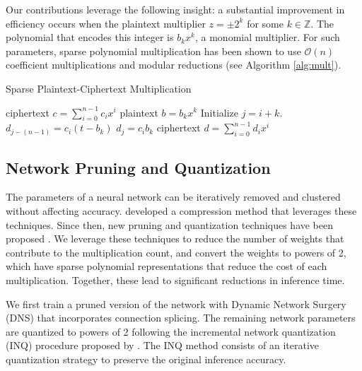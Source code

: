 \documentclass[conference]{IEEEtran}
\begin{document}
Our contributions leverage the following insight: a substantial improvement in efficiency occurs when the plaintext multiplier  $z = \pm 2^k$ for some $k \in \mathbb{Z}$.
The polynomial that encodes this integer is $b_k x^k$, a monomial multiplier.
For such parameters, sparse polynomial multiplication \cite{akleylek2016efficient} has been shown to use $\mathcal{O}(n)$ coefficient multiplications and modular reductions (see Algorithm \ref{alg:mult}).

\begin{algorithm}[!htbp]%
   \caption{Sparse Plaintext-Ciphertext Multiplication}
   \label{alg:mult}
\begin{algorithmic}
    ciphertext $c = \sum_{i=0}^{n - 1} c_ix^i$
   plaintext $b=b_k x^k$
   \STATE Initialize $j = i + k$.
   \STATE $d_{j-(n-1)} = c_i (t - b_k)$
   \ELSE
   \STATE $d_j = c_i b_k$
   \ENDIF
   \ENDFOR
    ciphertext $d = \sum_{i=0}^{n - 1} d_ix^i$
\end{algorithmic}
\end{algorithm}


\subsection{Network Pruning and Quantization}\label{sec:pruning}

The parameters of a neural network can be iteratively removed and clustered without affecting accuracy.
\cite{han2015deep} developed a compression method that leverages these techniques.
Since then, new pruning and quantization techniques have been proposed \cite{luo2017thinet}. %
We leverage these techniques to reduce the number of weights that contribute to the multiplication count, and convert the weights to powers of 2, which have sparse polynomial representations that reduce the cost of each multiplication. Together, these lead to significant reductions in inference time.

We first train a pruned version of the network with Dynamic Network Surgery (DNS) \cite{guo2016dynamic} that incorporates connection splicing.
The remaining network parameters are quantized to powers of 2 following the incremental network quantization (INQ) procedure proposed by \cite{zhou2017incremental}.
The INQ method consists of an iterative quantization strategy to preserve the original inference accuracy.
\end{document}
